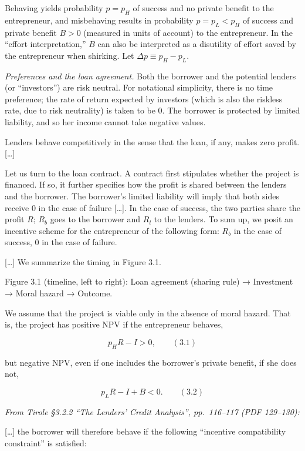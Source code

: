 \documentclass[11pt,a4paper]{article}
\begin{document}
Behaving yields probability \(p = p_H\) of success and no private benefit to the entrepreneur, and
misbehaving results in probability \(p = p_L < p_H\) of success and private benefit \(B > 0\)
(measured in units of account) to the entrepreneur. In the ``effort interpretation,'' \(B\) can also
be interpreted as a disutility of effort saved by the entrepreneur when shirking. Let
\(\Delta p \equiv p_H - p_L\).

\emph{Preferences and the loan agreement.} Both the borrower and the potential lenders (or
``investors'') are risk neutral. For notational simplicity, there is no time preference; the rate of
return expected by investors (which is also the riskless rate, due to risk neutrality) is taken to
be 0. The borrower is protected by limited liability, and so her income cannot take negative values.

Lenders behave competitively in the sense that the loan, if any, makes zero profit. {[}\ldots{]}

Let us turn to the loan contract. A contract first stipulates whether the project is financed. If
so, it further specifies how the profit is shared between the lenders and the borrower. The
borrower's limited liability will imply that both sides receive 0 in the case of failure
{[}\ldots{]}. In the case of success, the two parties share the profit \(R\); \(R_b\) goes to the
borrower and \(R_l\) to the lenders. To sum up, we posit an incentive scheme for the entrepreneur of
the following form: \(R_b\) in the case of success, 0 in the case of failure.

{[}\ldots{]} We summarize the timing in Figure 3.1.

Figure 3.1 (timeline, left to right): Loan agreement (sharing rule) → Investment → Moral hazard →
Outcome.

We assume that the project is viable only in the absence of moral hazard. That is, the project has
positive NPV if the entrepreneur behaves,

\[p_H R - I > 0, \qquad (3.1)\]

but negative NPV, even if one includes the borrower's private benefit, if she does not,

\[p_L R - I + B < 0. \qquad (3.2)\]

\emph{From Tirole §3.2.2 ``The Lenders' Credit Analysis'', pp.~116--117 (PDF 129--130):}

{[}\ldots{]} the borrower will therefore behave if the following ``incentive compatibility
constraint'' is satisfied:
\end{document}

